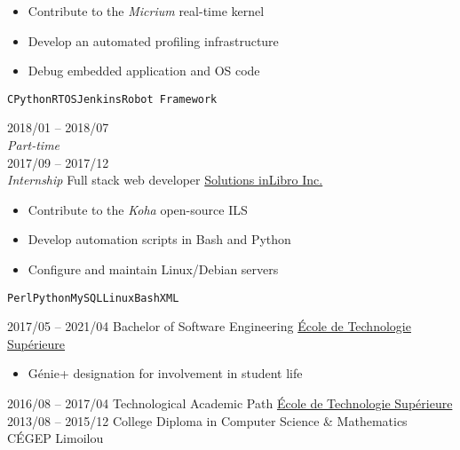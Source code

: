 \documentclass[9pt]{developercv} %
\begin{document}
\begin{minipage}[t]{0.8\textwidth}
\begin{entrylist}
{\begin{itemize}
				\renewcommand{\labelitemi}{\raisebox{.45ex}{\rule{.6ex}{.6ex}}}
				\setlength\itemsep{-1pt}
				\item Contribute to the \emph{Micrium} real-time kernel
				\item Develop an automated profiling infrastructure
				\item Debug embedded application and OS code
			\end{itemize}
			\vspace{-4pt}
			\texttt{C}\slashsep\texttt{Python}\slashsep\texttt{RTOS}\slashsep\texttt{Jenkins}\slashsep\texttt{Robot Framework}
		}
	\entry
		{2018/01 -- 2018/07\\{\small\emph{Part-time}}\\2017/09 -- 2017/12\\{\small\emph{Internship}}}
		{Full stack web developer}
		{\href{https://inlibro.com/en/}{Solutions inLibro Inc.}}
		{
			\vspace{-14pt}
			\begin{itemize}
				\renewcommand{\labelitemi}{\raisebox{.45ex}{\rule{.6ex}{.6ex}}}
				\setlength\itemsep{-1pt}
				\item Contribute to the \emph{Koha} open-source ILS
				\item Develop automation scripts in Bash and Python
				\item Configure and maintain Linux/Debian servers
			\end{itemize}
			\vspace{-4pt}
			\texttt{Perl}\slashsep\texttt{Python}\slashsep\texttt{MySQL}\slashsep\texttt{Linux}\slashsep\texttt{Bash}\slashsep\texttt{XML}
		}
\end{entrylist}



\begin{entrylist}
	\setlength\itemsep{-1pt}
	\entry
		{2017/05 -- 2021/04}
		{Bachelor of Software Engineering}
		{\href{https://etsmtl.ca}{École de Technologie Supérieure}}
		{
			\vspace{-14pt}
			\begin{itemize}
				\renewcommand{\labelitemi}{\raisebox{.45ex}{\rule{.6ex}{.6ex}}}
				\setlength\itemsep{-1pt}
				\item Génie+ designation for involvement in student life
			\end{itemize}
			\vspace{-8pt}
		}
	\entry
		{2016/08 -- 2017/04}
		{Technological Academic Path}
		{\href{https://etsmtl.ca}{École de Technologie Supérieure}}
		{\vspace{-14pt}}
	\entry
		{2013/08 -- 2015/12}
		{College Diploma in Computer Science \& Mathematics}
		{CÉGEP Limoilou}
		{\vspace{-14pt}}
\end{entrylist}


\end{minipage}
\end{document}
